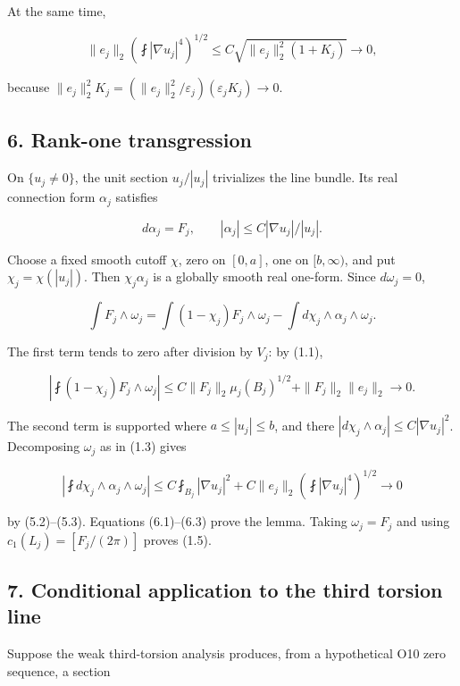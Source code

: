 \documentclass[11pt]{article}
\begin{document}
At the same time,

\[
\|e_j\|_2
\left(\fint|\nabla u_j|^4\right)^{1/2}
\le C\sqrt{\|e_j\|_2^2(1+K_j)}\longrightarrow0,
\tag{D.5.3}
\]

because
\(\|e_j\|_2^2 K_j=(\|e_j\|_2^2/\varepsilon_j)(\varepsilon_jK_j)\to0\).

\hypertarget{rank-one-transgression}{%
\subsection{6. Rank-one transgression}\label{rank-one-transgression}}

On \(\{u_j\ne0\}\), the unit section \(u_j/|u_j|\) trivializes the line
bundle. Its real connection form \(\alpha_j\) satisfies

\[
d\alpha_j=F_j,\qquad
|\alpha_j|\le C|\nabla u_j|/|u_j|.
\]

Choose a fixed smooth cutoff \(\chi\), zero on \([0,a]\), one on
\([b,\infty)\), and put \(\chi_j=\chi(|u_j|)\). Then \(\chi_j\alpha_j\)
is a globally smooth real one-form. Since \(d\omega_j=0\),

\[
\int F_j\wedge\omega_j
=\int(1-\chi_j)F_j\wedge\omega_j
-\int d\chi_j\wedge\alpha_j\wedge\omega_j.
\tag{D.6.1}
\]

The first term tends to zero after division by \(V_j\): by (1.1),

\[
\left|\fint(1-\chi_j)F_j\wedge\omega_j\right|
\le C\|F_j\|_2\mu_j(B_j)^{1/2}
+\|F_j\|_2\|e_j\|_2\to0.
\tag{D.6.2}
\]

The second term is supported where \(a\le|u_j|\le b\), and there
\(|d\chi_j\wedge\alpha_j|\le C|\nabla u_j|^2\). Decomposing \(\omega_j\)
as in (1.3) gives

\[
\left|\fint d\chi_j\wedge\alpha_j\wedge\omega_j\right|
\le C\fint_{B_j}|\nabla u_j|^2
+C\|e_j\|_2\left(\fint|\nabla u_j|^4\right)^{1/2}\to0
\tag{D.6.3}
\]

by (5.2)--(5.3). Equations (6.1)--(6.3) prove the lemma. Taking
\(\omega_j=F_j\) and using \(c_1(L_j)=[F_j/(2\pi)]\) proves (1.5).

\hypertarget{conditional-application-to-the-third-torsion-line}{%
\subsection{7. Conditional application to the third torsion
line}\label{conditional-application-to-the-third-torsion-line}}

Suppose the weak third-torsion analysis produces, from a hypothetical
O10 zero sequence, a section
\end{document}
